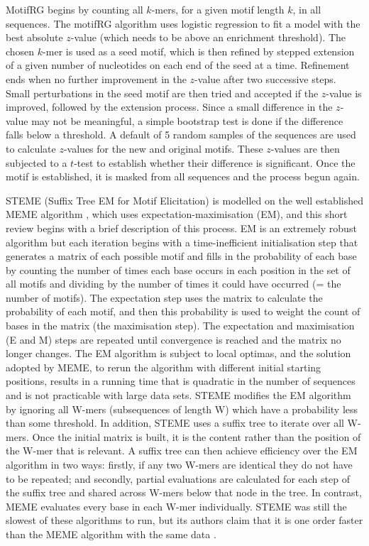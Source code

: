 \documentclass[12pt]{article}
\begin{document}
MotifRG \citep{yao2014discriminative} begins by counting all $k$-mers, for a given motif length $k$, in all sequences. The motifRG algorithm uses logistic regression to fit a model with the best absolute $z$-value (which needs to be above an enrichment threshold). The chosen $k$-mer is used as a seed motif, which is then refined by stepped extension of a given number of nucleotides on each end of the seed at a time. Refinement ends when no further improvement in the $z$-value after two successive steps. Small perturbations in the seed motif are then tried and accepted if the $z$-value is improved, followed by the extension process. Since a small difference in the $z$-value may not be meaningful, a simple bootstrap test is done if the difference falls below a threshold. A default of 5 random samples of the sequences are used to calculate $z$-values for the new and original motifs. These $z$-values are then subjected to a $t$-test to establish whether their difference is significant.
Once the motif is established, it is masked from all sequences and the process begun again.

STEME (Suffix Tree EM for Motif Elicitation) \citep{reid2011steme} is modelled on the well established MEME algorithm \citep{bailey2009meme}, which uses expectation-maximisation (EM), and this short review begins with a brief description of this process. EM is an extremely robust algorithm but each iteration begins with a time-inefficient initialisation step that generates a matrix of each possible motif and fills in the probability of each base by counting the number of times each base occurs in each position in the set of all motifs and dividing by the number of times it could have occurred (= the number of motifs). The expectation step uses the matrix to calculate the probability of each motif, and then this probability is used to weight the count of bases in the matrix (the maximisation step). The expectation and maximisation (E and M) steps are repeated until convergence is reached and the matrix no longer changes. The EM algorithm is subject to local optimas, and the solution adopted by MEME, to rerun the algorithm with different initial starting positions, results in a running time that is quadratic in the number of sequences and is not practicable with large data sets. STEME modifies the EM algorithm by ignoring all W-mers (subsequences of length W) which have a probability less than some threshold. In addition, STEME uses a suffix tree to iterate over all W-mers. Once the initial matrix is built, it is the content rather than the position of the W-mer that is relevant. A suffix tree can then achieve efficiency over the EM algorithm in two ways: firstly, if any two W-mers are identical they do not have to be repeated; and secondly, partial evaluations are calculated for each step of the suffix tree and shared across W-mers below that node in the tree. In contrast, MEME evaluates every base in each W-mer individually. STEME was still the slowest of these algorithms to run, but its authors claim that it is one order faster than the MEME algorithm with the same data \citep{reid2011steme}.
\end{document}
